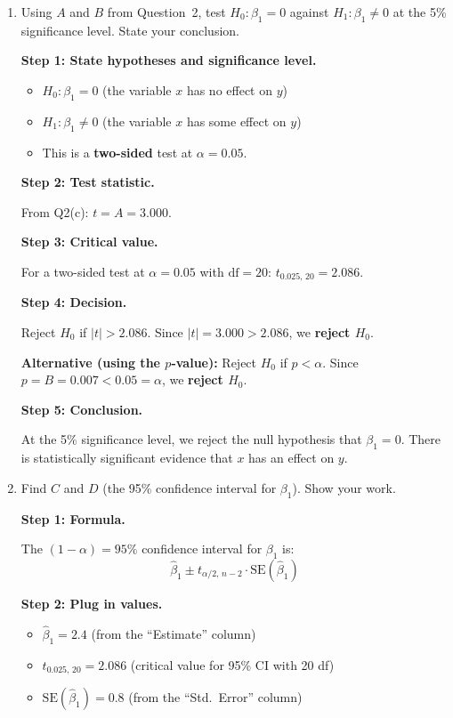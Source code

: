 \documentclass[11pt,a4paper]{article}
\begin{document}
\begin{enumerate}[label=(\alph*)]
\item Using $A$ and $B$ from Question~2, test $H_0\colon \beta_1 = 0$ against $H_1\colon \beta_1 \ne 0$ at the 5\% significance level. State your conclusion.

\begin{solution}
\textbf{Step 1: State hypotheses and significance level.}
\begin{itemize}
  \item $H_0\colon \beta_1 = 0$ (the variable $x$ has no effect on $y$)
  \item $H_1\colon \beta_1 \ne 0$ (the variable $x$ has some effect on $y$)
  \item This is a \textbf{two-sided} test at $\alpha = 0.05$.
\end{itemize}

\textbf{Step 2: Test statistic.}

From Q2(c): $t = A = 3.000$.

\textbf{Step 3: Critical value.}

For a two-sided test at $\alpha = 0.05$ with $\text{df} = 20$: $t_{0.025,\, 20} = 2.086$.

\textbf{Step 4: Decision.}

Reject $H_0$ if $|t| > 2.086$. Since $|t| = 3.000 > 2.086$, we \textbf{reject $H_0$}.

\textbf{Alternative (using the $p$-value):} Reject $H_0$ if $p < \alpha$. Since $p = B = 0.007 < 0.05 = \alpha$, we \textbf{reject $H_0$}. \checkmark

\textbf{Step 5: Conclusion.}

At the 5\% significance level, we reject the null hypothesis that $\beta_1 = 0$. There is statistically significant evidence that $x$ has an effect on $y$.
\end{solution}

\item Find $C$ and $D$ (the 95\% confidence interval for $\beta_1$). Show your work.

\begin{solution}
\textbf{Step 1: Formula.}

The $(1-\alpha) = 95\%$ confidence interval for $\beta_1$ is:
\[
  \hat{\beta}_1 \pm t_{\alpha/2,\, n-2} \cdot \text{SE}(\hat{\beta}_1)
\]

\textbf{Step 2: Plug in values.}
\begin{itemize}
  \item $\hat{\beta}_1 = 2.4$ (from the ``Estimate'' column)
  \item $t_{0.025,\, 20} = 2.086$ (critical value for 95\% CI with 20 df)
  \item $\text{SE}(\hat{\beta}_1) = 0.8$ (from the ``Std.\ Error'' column)
\end{itemize}


\end{solution}
\end{enumerate}
\end{document}
